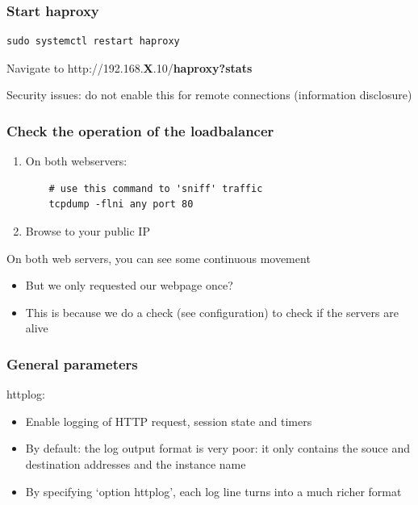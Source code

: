 \documentclass{article}
\begin{document}
\subsubsection{Start haproxy}

\begin{verbatim}
sudo systemctl restart haproxy
\end{verbatim}

Navigate to http://192.168.\textbf{X}.10/\textbf{haproxy?stats}

Security issues: do not enable this for remote connections (information disclosure)

\subsubsection{Check the operation of the loadbalancer}

\begin{enumerate}
    \item On both webservers: 
\begin{verbatim}
    # use this command to 'sniff' traffic
    tcpdump -flni any port 80
\end{verbatim}
    \item Browse to your public IP
\end{enumerate}

On both web servers, you can see some continuous movement

\begin{itemize}
    \item But we only requested our webpage once?
    \item This is because we do a check (see configuration) to check if the servers are alive
\end{itemize}

\subsubsection{General parameters}

httplog:

\begin{itemize}
    \item Enable logging of HTTP request, session state and timers
    \item By default: the log output format is very poor: it only contains the souce and destination addresses and the instance name
    \item By specifying `option httplog', each log line turns into a much richer format
\end{itemize}
\end{document}

